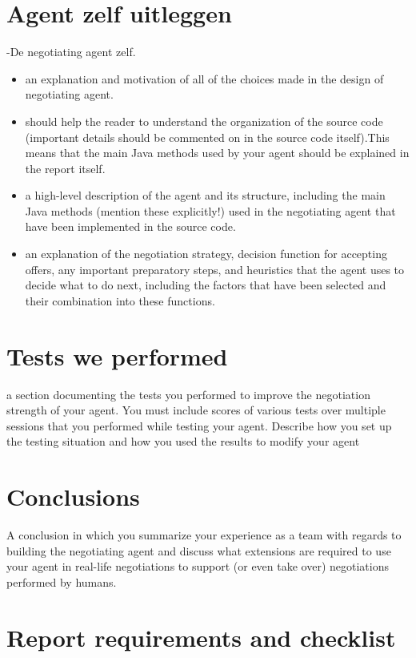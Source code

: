\documentclass[11pt,a4paper]{report}
\begin{document}
\newpage

\section*{Agent zelf uitleggen}
-De negotiating agent zelf.

\begin{itemize}
\item an explanation and motivation of all of the choices made in the design of negotiating agent.
\item should help the reader to understand the organization of the source code (important details should be commented on in the source code itself).This means that the main Java methods used by your agent should
be explained in the report itself.
\item a high-level description of the agent and its structure, including the main Java methods (mention these explicitly!) used in the negotiating agent that have been implemented in the source code.
\item an explanation of the negotiation strategy, decision function for accepting offers, any important preparatory steps, and heuristics that the agent uses to decide what to do next, including the factors that have been selected and their combination into these functions.
\end{itemize}

\section*{Tests we performed}

a section documenting the tests you performed to improve the negotiation strength of your agent.
You must include scores of various tests over multiple sessions that you performed while testing
your agent. Describe how you set up the testing situation and how you used the results to modify
your agent

\section*{Conclusions}

A conclusion in which you summarize your experience as a team with regards to building the
negotiating agent and discuss what extensions are required to use your agent in real-life negotiations to support (or even take over) negotiations performed by humans.

\newpage

\section*{Report requirements and checklist}
\end{document}
